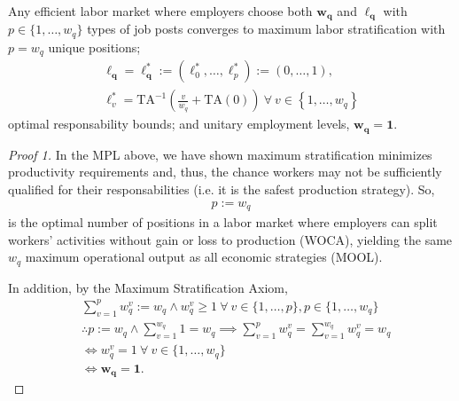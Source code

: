 \documentclass[hidelinks, nonatbib]{elsarticle}
\begin{document}
\begin{lemma}
    Any efficient labor market where employers choose both $\boldsymbol{w_q}$ and $\boldsymbol{\ell_q}$ with $p \in \{1, \dots, w_q\}$ types of job posts converges to maximum labor stratification with
    $
    p = w_q
    $
    unique positions;
    \begin{gather}
    \boldsymbol{\ell_q} = 
    \boldsymbol{\ell_{q}^{*}}
    :=
    (
        \ell_{0}^{*}
        ,
        \dots
        ,
        \ell_{p}^{*}
    )
    :=
    (
        0
        ,
        \dots
        ,
        1
    )
    ,
    \\
    \ell_{v}^{*}
    =
    \text{TA}^{-1}\left(
        \frac{v}{w_q}
        +
        \text{TA}(0)
    \right)
    \
    \forall
    \
    v \in 
    \left\{
        1, \dots, w_q
    \right\}
    \end{gather}
    optimal responsability bounds; and unitary employment levels,
    $
    \boldsymbol{w_q} =
    \boldsymbol{1}
    .
    $
    
    \begin{proof}[Proof 1]
        In the MPL above, we have shown maximum stratification minimizes productivity requirements and, thus, the chance workers may not be sufficiently qualified for their responsabilities (i.e. it is the safest production strategy). So, 
        \begin{gather}
            p := w_q
        \end{gather}
        is the optimal number of positions in a labor market where employers can split workers' activities without gain or loss to production (WOCA), yielding the same $w_q$ maximum operational output as all economic strategies (MOOL).
        
        In addition, by the Maximum Stratification Axiom,
        \begin{align}
            &
            \sum_{v=1}^{p}{
                w_{q}^{v}
            }
            := 
            w_q
            \land
            w_{q}^{v} 
            \geq 
            1
            \
            \forall
            \
            v \in \{1, \dots, p\},
            p \in \{1, \dots, w_q\}
            \\
            &
            \therefore
            p := w_q
            \land
            \sum_{v=1}^{w_q}
            1
            =
            w_q
            \implies
            \sum_{v=1}^{p}{
                w_{q}^{v}
            }
            =
            \sum_{v=1}^{w_q}{
                w_{q}^{v}
            }
            =
            w_q
            \\
            &
            \iff
            w_{q}^{v}
            =
            1
            \
            \forall
            \
            v \in \{1, \dots, w_q\}
            \\
            &
            \iff
            \boldsymbol{w_q} =
            \boldsymbol{1}
            .
            \end{align}
            

\end{proof}
\end{lemma}
\end{document}
